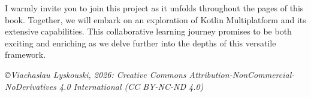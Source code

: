 \vspace{3mm}

\noindent I warmly invite you to join this project as it unfolds throughout the pages of this book. Together, we will 
embark on an exploration of Kotlin Multiplatform and its extensive capabilities. This collaborative learning journey 
promises to be both exciting and enriching as we delve further into the depths of this versatile framework.


\vspace{1cm}

\noindent \emph{\small \copyright Viachaslau Lyskouski, 2026: Creative Commons Attribution-NonCommercial-NoDerivatives 
4.0 International (CC BY-NC-ND 4.0)}

\newpage
\thispagestyle{empty}
~